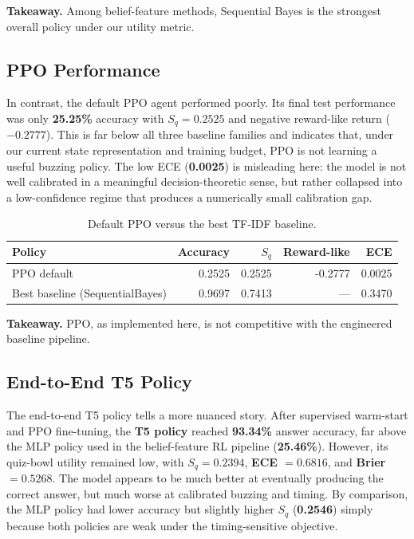 \documentclass[11pt]{article}
\begin{document}
\noindent\textbf{Takeaway.} Among belief-feature methods, Sequential Bayes is
the strongest overall policy under our utility metric.

\subsection{PPO Performance}

In contrast, the default PPO agent performed poorly. Its final test performance
was only \textbf{25.25\%} accuracy with \textbf{$S_q = 0.2525$} and negative
reward-like return (\textbf{$-0.2777$}). This is far below all three baseline
families and indicates that, under our current state representation and
training budget, PPO is not learning a useful buzzing policy. The low ECE
(\textbf{0.0025}) is misleading here: the model is not well calibrated in a
meaningful decision-theoretic sense, but rather collapsed into a low-confidence
regime that produces a numerically small calibration gap.

\begin{table}[h]
\centering
\begin{tabular}{lrrrr}
\toprule
Policy & Accuracy & $S_q$ & Reward-like & ECE \\
\midrule
PPO default & 0.2525 & 0.2525 & -0.2777 & 0.0025 \\
Best baseline (SequentialBayes) & 0.9697 & 0.7413 & --- & 0.3470 \\
\bottomrule
\end{tabular}
\caption{Default PPO versus the best TF-IDF baseline.}
\end{table}

\noindent\textbf{Takeaway.} PPO, as implemented here, is not competitive with
the engineered baseline pipeline.

\subsection{End-to-End T5 Policy}

The end-to-end T5 policy tells a more nuanced story. After supervised warm-start
and PPO fine-tuning, the \textbf{T5 policy} reached \textbf{93.34\%} answer
accuracy, far above the MLP policy used in the belief-feature RL pipeline
(\textbf{25.46\%}). However, its quiz-bowl utility remained low, with
\textbf{$S_q = 0.2394$}, \textbf{ECE $= 0.6816$}, and
\textbf{Brier $= 0.5268$}. The model appears to be much better at eventually
producing the correct answer, but much worse at calibrated buzzing and timing.
By comparison, the MLP policy had lower accuracy but slightly higher $S_q$
(\textbf{0.2546}) simply because both policies are weak under the
timing-sensitive objective.
\end{document}
